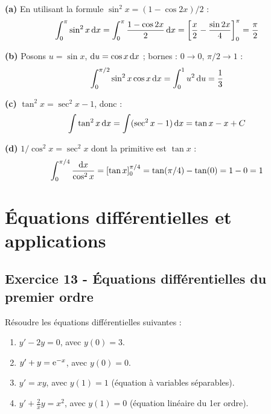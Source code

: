 \documentclass[12pt,a4paper]{article}
\begin{document}
\begin{boitecorrige}
\textbf{(a)} En utilisant la formule $\sin^2 x = (1-\cos 2x)/2$ :
\[
\int_0^\pi\sin^2 x\,\mathrm{d} x = \int_0^\pi\frac{1-\cos2x}{2}\,\mathrm{d} x = \left[\frac{x}{2}-\frac{\sin2x}{4}\right]_0^\pi = \frac{\pi}{2}
\]

\textbf{(b)} Posons $u=\sin x$, $\mathrm{d} u=\cos x\,\mathrm{d} x$ ; bornes : $0\to0$, $\pi/2\to1$ :
\[
\int_0^{\pi/2}\sin^2 x\cos x\,\mathrm{d} x = \int_0^1 u^2\,\mathrm{d} u = \frac{1}{3}
\]

\textbf{(c)} $\tan^2 x = \sec^2 x - 1$, donc :
\[
\int\tan^2 x\,\mathrm{d} x = \int(\sec^2 x-1)\,\mathrm{d} x = \tan x - x + C
\]

\textbf{(d)} $1/\cos^2 x = \sec^2 x$ dont la primitive est $\tan x$ :
\[
\int_0^{\pi/4}\frac{\mathrm{d} x}{\cos^2 x} = [\tan x]_0^{\pi/4} = \tan(\pi/4)-\tan(0) = 1-0 = 1
\]
\end{boitecorrige}

\section{Équations différentielles et applications}

\subsection*{Exercice 13 - Équations différentielles du premier ordre \niveau{\moyen}}

\begin{boiteexercice}
Résoudre les équations différentielles suivantes :
\begin{enumerate}[label=(\alph*)]
  \item $y' - 2y = 0$, avec $y(0) = 3$.
  \item $y' + y = \mathrm{e}^{-x}$, avec $y(0) = 0$.
  \item $y' = xy$, avec $y(1) = 1$ (équation à variables séparables).
  \item $y' + \frac{2}{x}y = x^2$, avec $y(1) = 0$ (équation linéaire du 1er ordre).
\end{enumerate}
\end{boiteexercice}
\end{document}
